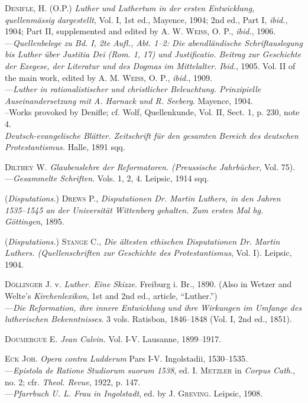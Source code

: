 \textsc{Denifle, H.} (O.P.) \textit{Luther und Luthertum in der ersten Entwicklung,
quellenmässig dargestellt}, Vol. I, 1st ed., Mayence, 1904; 2nd ed., Part I,
\textit{ibid.}, 1904; Part II, supplemented and edited by \textsc{A. W. Weiss, O. P.},
\textit{ibid.}, 1906.\\
---\textit{Quellenbelege zu Bd. I, 2te Aufl., Abt. 1--2: Die abendländische
Schriftauslegung bis Luther über Justitia Dei (Rom. 1, 17) und
Justificatio. Beitrag zur Geschichte der Exegese, der Literatur und des Dogmas
im Mittelalter. Ibid.}, 1905. Vol. II of the main work, edited by \textsc{A. M.
Weiss, O. P.}, \textit{ibid.}, 1909.\\
---\textit{Luther in rationalistischer und christlicher Beleuchtung. Prinzipielle
Auseinandersetzung mit A. Harnack und R. Seeberg}. Mayence, 1904.\\
--Works provoked by Denifle; cf. Wolf, Quellenkunde, Vol. II, Sect. 1, p.
230, note 4.\\

\textit{Deutsch-evangelische Blätter. Zeitschrift für den gesamten Bereich des deutschen
Protestantismus.} Halle, 1891 sqq.

\textsc{Dilthey W.} \textit{Glaubenslehre der Reformatoren. (Preussische Jahrbücher}, Vol.
75). \\
---\textit{Gesammelte Schriften}. Vols. 1, 2, 4. Leipsic, 1914 sqq.

(\textit{Disputations.}) \textsc{Drews P.}, \textit{Disputationen Dr. Martin Luthers, in den
Jahren 1535--1545 an der Universität Wittenberg gehalten. Zum ersten
Mal hg. Göttingen}, 1895.

(\textit{Disputations.}) \textsc{Stange C.}, \textit{Die ältesten ethischen Disputationen Dr. Martin
Luthers. (Quellenschriften zur Geschichte des Protestantismus}, Vol. I).
Leipsic, 1904.

\textsc{Döllinger} J. v. \textit{Luther. Eine Skizze.} Freiburg i. Br., 1890. (Also in Wetzer
and Welte’s \textit{Kirchenlexikon}, 1st and 2nd ed., article, “Luther.”) \\
---\textit{Die Reformation, ihre innere Entwicklung und ihre Wirkungen im
Umfange des lutherischen Bekenntnisses}. 3 vols. Ratisbon, 1846--1848 (Vol.
I, 2nd ed., 1851).

\textsc{Doumergue E.} \textit{Jean Calvin.} Vol. I-V. Lausanne, 1899--1917.

\textsc{Eck Joh}. \textit{Opera contra Ludderum} Pars I-V. Ingolstadii, 1530--1535. \\
---\textit{Epistola de Ratione Studiorum suorum 1538}, ed. \textsc{I. Metzler} in \textit{Corpus
Cath.}, no. 2; cfr. \textit{Theol. Revue}, 1922, p. 147. \\
---\textit{Pfarrbuch U. L. Frau in Ingolstadt}, ed. by \textsc{J. Greving.} Leipsic, 1908.

